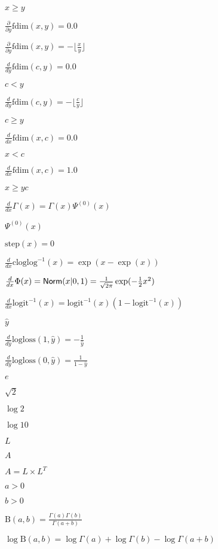 \documentclass{article}
\begin{document}
$x \geq y$
\pagebreak

$\frac{\partial}{\partial y} \mbox{fdim}(x,y) = 0.0$
\pagebreak

$\frac{\partial}{\partial y} \mbox{fdim}(x,y) = -\lfloor\frac{x}{y}\rfloor$
\pagebreak

$\frac{d}{d y} \mbox{fdim}(c,y) = 0.0$
\pagebreak

$c < y$
\pagebreak

$\frac{d}{d y} \mbox{fdim}(c,y) = -\lfloor\frac{c}{y}\rfloor$
\pagebreak

$c \geq y$
\pagebreak

$\frac{d}{d x} \mbox{fdim}(x,c) = 0.0$
\pagebreak

$x < c$
\pagebreak

$\frac{d}{d x} \mbox{fdim}(x,c) = 1.0$
\pagebreak

$x \geq yc$
\pagebreak

$\frac{d}{dx} \Gamma(x) = \Gamma(x) \Psi^{(0)}(x)$
\pagebreak

$\Psi^{(0)}(x)$
\pagebreak

$\mbox{step}(x) = 0$
\pagebreak

$\frac{d}{dx} \mbox{cloglog}^{-1}(x) = \exp (x - \exp (x))$
\pagebreak

$\frac{d}{dx} \Phi(x) = \mbox{\sf Norm}(x|0,1) = \frac{1}{\sqrt{2\pi}} \exp(-\frac{1}{2} x^2)$
\pagebreak

$\frac{d}{dx} \mbox{logit}^{-1}(x) = \mbox{logit}^{-1}(x) (1 - \mbox{logit}^{-1}(x))$
\pagebreak

$\hat{y}$
\pagebreak

$\frac{d}{d\hat{y}} \mbox{logloss}(1,\hat{y}) = - \frac{1}{\hat{y}}$
\pagebreak

$\frac{d}{d\hat{y}} \mbox{logloss}(0,\hat{y}) = \frac{1}{1 - \hat{y}}$
\pagebreak

$ e $
\pagebreak

$ \sqrt{2} $
\pagebreak

$ \log 2 $
\pagebreak

$ \log 10 $
\pagebreak

$L$
\pagebreak

$A$
\pagebreak

$A = L \times L^T$
\pagebreak

$a > 0$
\pagebreak

$b > 0$
\pagebreak

$\mbox{B}(a,b) = \frac{\Gamma(a) \Gamma(b)}{\Gamma(a+b)}$
\pagebreak

$\log \mbox{B}(a,b) = \log \Gamma(a) + \log \Gamma(b) - \log \Gamma(a+b)$
\pagebreak
\end{document}
